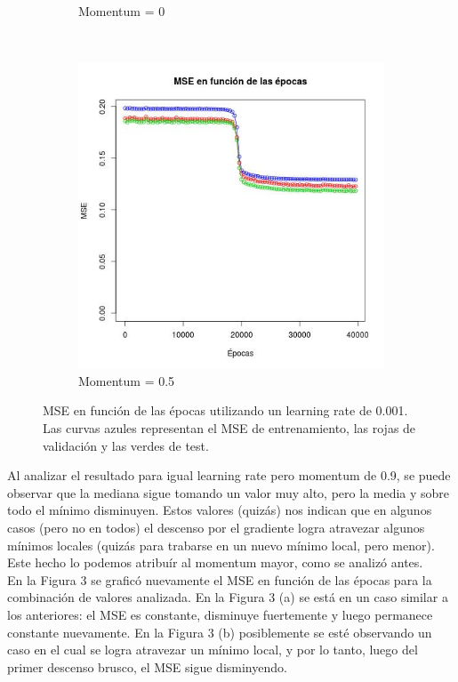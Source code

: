 \documentclass[12pt, a4paper]{article}
\begin{document}
\begin{figure}
\begin{subfigure}[b]{0.45\textwidth}
        \caption{Momentum = 0}
    \end{subfigure}
    ~ %
    \begin{subfigure}[b]{0.45\textwidth}
        \includegraphics[width=\textwidth]{mse23}
        \caption{Momentum = 0.5}
    \end{subfigure}
    \caption{MSE en función de las épocas utilizando un learning rate de 0.001. Las curvas azules representan el MSE de entrenamiento, las rojas de validación y las verdes de test.}
\end{figure}

\bigskip

Al analizar el resultado para igual learning rate pero momentum de 0.9, se puede observar que la mediana sigue tomando un valor muy alto, pero la media y sobre todo el mínimo disminuyen. Estos valores (quizás) nos indican que en algunos casos (pero no en todos) el descenso por el gradiente logra atravezar algunos mínimos locales (quizás para trabarse en un nuevo mínimo local, pero menor). Este hecho lo podemos atribuír al momentum mayor, como se analizó antes. \\
En la Figura 3 se graficó nuevamente el MSE en función de las épocas para la combinación de valores analizada. En la Figura 3 (a) se está en un caso similar a los anteriores: el MSE es constante, disminuye fuertemente y luego permanece constante nuevamente. En la Figura 3 (b) posiblemente se esté observando un caso en el cual se logra atravezar un mínimo local, y por lo tanto, luego del primer descenso brusco, el MSE sigue disminyendo.
\end{document}

